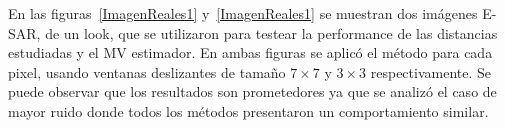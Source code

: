En las figuras~\ref{ImagenReales1} y~\ref{ImagenReales1} se muestran dos imágenes E-SAR, de un look, que se utilizaron para testear la performance de las distancias estudiadas y el MV estimador. En ambas figuras se aplicó el método para cada pixel, usando ventanas deslizantes de tamaño $7 \times 7$ y $3 \times 3$ respectivamente. Se puede observar que los resultados son prometedores ya que se analizó el caso de mayor ruido donde todos los métodos presentaron un comportamiento similar.


\begin{figure}[htb]
	\begin{minipage}[b]{0.45\linewidth} %
		\centering
		\\

\end{minipage}
\end{figure}

